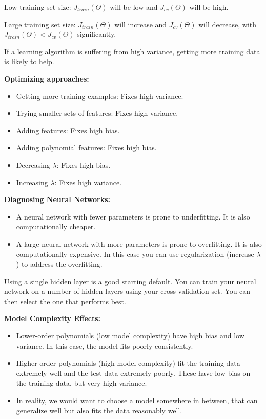 \documentclass{article}
\begin{document}
\noindent Low training set size: \(J_{train}(\Theta)\) will be low and \(J_{cv}(\Theta)\) will be high.

\noindent Large training set size: \(J_{train}(\Theta)\) will increase and \(J_{cv}(\Theta)\) will decrease, with \(J_{train}(\Theta) < J_{cv}(\Theta)\) significantly.

\noindent If a learning algorithm is suffering from high variance, getting more training data is likely to help.

\bigskip

\noindent \textbf{Optimizing approaches:}

\begin{itemize}
\item Getting more training examples: Fixes high variance.
\item Trying smaller sets of features: Fixes high variance.
\item Adding features: Fixes high bias.
\item Adding polynomial features: Fixes high bias.
\item Decreasing \(\lambda\): Fixes high bias.
\item Increasing \(\lambda\): Fixes high variance.
\end{itemize}

\noindent \textbf{Diagnosing Neural Networks:}

\begin{itemize}
\item A neural network with fewer parameters is prone to underfitting. It is also computationally cheaper.
\item A large neural network with more parameters is prone to overfitting. It is also computationally expensive. In this case you can use regularization (increase \(\lambda\)) to address the overfitting.
\end{itemize}

\noindent Using a single hidden layer is a good starting default. You can train your neural network on a number of hidden layers using your cross validation set. You can then select the one that performs best.

\bigskip

\noindent \textbf{Model Complexity Effects:}

\begin{itemize}
\item Lower-order polynomials (low model complexity) have high bias and low variance. In this case, the model fits poorly consistently.
\item Higher-order polynomials (high model complexity) fit the training data extremely well and the test data extremely poorly. These have low bias on the training data, but very high variance.
\item In reality, we would want to choose a model somewhere in between, that can generalize well but also fits the data reasonably well.
\end{itemize}
\end{document}
